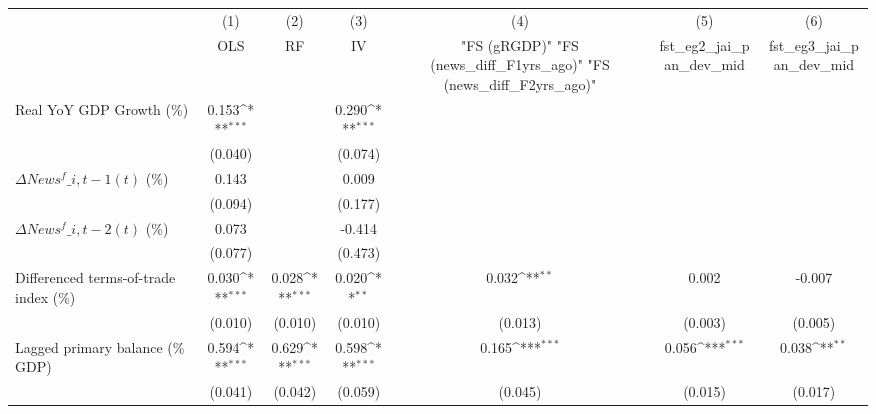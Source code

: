 {
\def\sym#1{\ifmmode^{#1}\else\(^{#1}\)\fi}
\begin{tabular}{l*{6}{c}}
\toprule
                    &\multicolumn{1}{c}{(1)}&\multicolumn{1}{c}{(2)}&\multicolumn{1}{c}{(3)}&\multicolumn{1}{c}{(4)}&\multicolumn{1}{c}{(5)}&\multicolumn{1}{c}{(6)}\\
                    &\multicolumn{1}{c}{OLS}&\multicolumn{1}{c}{RF}&\multicolumn{1}{c}{IV}&\multicolumn{1}{c}{ "FS (gRGDP)"  "FS (news\_diff\_F1yrs\_ago)"  "FS (news\_diff\_F2yrs\_ago)" }&\multicolumn{1}{c}{fst\_eg2\_jai\_pan\_dev\_mid}&\multicolumn{1}{c}{fst\_eg3\_jai\_pan\_dev\_mid}\\
\midrule
Real YoY GDP Growth (\%)&       0.153\sym{***}&                     &       0.290\sym{***}&                     &                     &                     \\
                    &     (0.040)         &                     &     (0.074)         &                     &                     &                     \\
\addlinespace
$ \Delta News^f\_{i,t-1}(t)$ (\%)&       0.143         &                     &       0.009         &                     &                     &                     \\
                    &     (0.094)         &                     &     (0.177)         &                     &                     &                     \\
\addlinespace
$ \Delta News^f\_{i,t-2}(t)$ (\%)&       0.073         &                     &      -0.414         &                     &                     &                     \\
                    &     (0.077)         &                     &     (0.473)         &                     &                     &                     \\
\addlinespace
Differenced terms-of-trade index (\%)&       0.030\sym{***}&       0.028\sym{***}&       0.020\sym{**} &       0.032\sym{**} &       0.002         &      -0.007         \\
                    &     (0.010)         &     (0.010)         &     (0.010)         &     (0.013)         &     (0.003)         &     (0.005)         \\
\addlinespace
Lagged primary balance (\% GDP)&       0.594\sym{***}&       0.629\sym{***}&       0.598\sym{***}&       0.165\sym{***}&       0.056\sym{***}&       0.038\sym{**} \\
                    &     (0.041)         &     (0.042)         &     (0.059)         &     (0.045)         &     (0.015)         &     (0.017)         \\

\end{tabular}}
